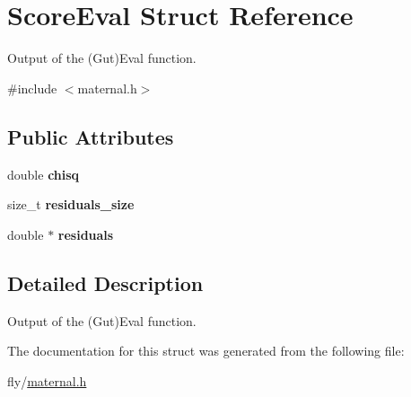 \hypertarget{structScoreEval}{
\section{ScoreEval Struct Reference}
\label{structScoreEval}
}


Output of the (Gut)Eval function.  


{\ttfamily \#include $<$maternal.h$>$}\subsection*{Public Attributes}
\begin{DoxyCompactItemize}
\item 
\hypertarget{structScoreEval_a0067e7d3936723f0c9ea46706507ce43}{
double {\bfseries chisq}}
\label{structScoreEval_a0067e7d3936723f0c9ea46706507ce43}

\item 
\hypertarget{structScoreEval_ace0ad0fb85b9c2a9b1c182d69a2d640c}{
size\_\-t {\bfseries residuals\_\-size}}
\label{structScoreEval_ace0ad0fb85b9c2a9b1c182d69a2d640c}

\item 
\hypertarget{structScoreEval_a477e540d11fd7e84922b8d85b3e55bac}{
double $\ast$ {\bfseries residuals}}
\label{structScoreEval_a477e540d11fd7e84922b8d85b3e55bac}

\end{DoxyCompactItemize}


\subsection{Detailed Description}
Output of the (Gut)Eval function. 

The documentation for this struct was generated from the following file:\begin{DoxyCompactItemize}
\item 
fly/\hyperlink{maternal_8h}{maternal.h}\end{DoxyCompactItemize}
